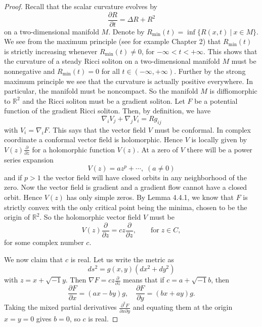 \begin{proof}
Recall that the scalar curvature evolves by
$$
\frac{\partial R}{\partial t}=\Delta R+R^2
$$
on a two-dimensional manifold $M$. Denote by
$R_{\min}(t)=\inf\{R(x,t)\ |\ x\in M\}.$ We see from the maximum
principle (see for example Chapter 2) that $R_{\min}(t)$ is
strictly increasing whenever $R_{\min}(t)\neq 0$, for
$-\infty<t<+\infty$. This shows that the curvature of a steady
Ricci soliton on a two-dimensional manifold $M$ must be
nonnegative and $R_{\min}(t) = 0$ for all $t \in
(-\infty,+\infty)$. Further by the strong maximum principle we see
that the curvature is actually positive everywhere. In particular,
the manifold must be noncompact. So the manifold $M$ is
diffiomorphic to $\mathbb{R}^2$ and the Ricci soliton must be a
gradient soliton. Let $F$ be a potential function of the gradient
Ricci soliton. Then, by definition, we have
$$
\nabla_iV_j+\nabla_jV_i=Rg_{ij}
$$
with $V_i=\nabla_iF$. This says that the vector field $V$ must be
conformal. In complex coordinate a conformal vector field is
holomorphic. Hence $V$ is locally given by
$V(z)\frac{\partial}{\partial z}$ for a holomorphic function
$V(z)$. At a zero of $V$ there will be a power series expansion
$$
V(z)=az^p+\cdots,\;(a\neq 0)
$$
and if $p>1$ the vector field will have closed orbits in any
neighborhood of the zero. Now the vector field is gradient and a
gradient flow cannot have a closed orbit. Hence $V(z)$ has only
simple zeros. By Lemma 4.4.1, we know that $F$ is strictly convex
with the only critical point being the minima, chosen to be the
origin of $\mathbb{R}^2$. So the holomorphic vector field $V$ must
be
$$
V(z)\frac{\partial}{\partial z} =cz\frac{\partial}{\partial
z},\qquad \text{for}\;z\in C,
$$
for some complex number $c$.

We now claim that $c$ is real. Let us write the metric as
$$
ds^2=g(x,y)(dx^2+dy^2)
$$
with $z=x+\sqrt{-1}y.$ Then $\nabla F=cz\frac{\partial}{\partial
z}$ means that if $c=a+\sqrt{-1}b$, then
$$
\frac{\partial F}{\partial x}=(ax-by)g,\quad \frac{\partial
F}{\partial y}=(bx+ay)g.
$$
Taking the mixed partial derivatives $\frac{\partial^2 F}{\partial
x\partial y}$ and equating them at the origin $x=y=0$ gives $b=0$,
so $c$ is real.


\end{proof}
